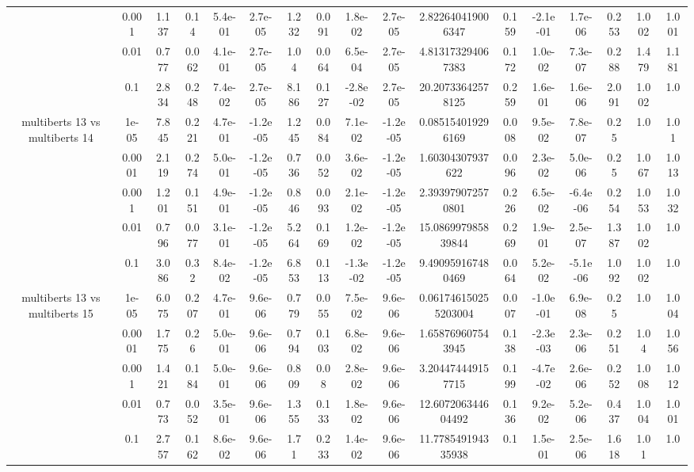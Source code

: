 \begin{tabular}{|c|c|c|c|c|c|c|c|c|c|c|c|c|c|c|c|c|}
 & 0.001 & 1.137 & 0.14 & 5.4e-01 & 2.7e-05 & 1.232 & 0.091 & 1.8e-02 & 2.7e-05 & 2.822640419006347 & 0.159 & -2.1e-01 & 1.7e-06 & 0.253 & 1.002 & 1.001 \\
 & 0.01 & 0.777 & 0.062 & 4.1e-01 & 2.7e-05 & 1.04 & 0.064 & 6.5e-04 & 2.7e-05 & 4.813173294067383 & 0.172 & 1.0e-02 & 7.3e-07 & 0.288 & 1.479 & 1.181 \\
 & 0.1 & 2.834 & 0.248 & 7.4e-02 & 2.7e-05 & 8.186 & 0.127 & -2.8e-02 & 2.7e-05 & 20.20733642578125 & 0.259 & 1.6e-01 & 1.6e-06 & 2.091 & 1.002 & 1.0 \\
\hline
\multirow{5}{*}{multiberts 13 vs multiberts 14} & 1e-05 & 7.845 & 0.221 & 4.7e-01 & -1.2e-05 & 1.245 & 0.084 & 7.1e-02 & -1.2e-05 & 0.085154019296169 & 0.008 & 9.5e-02 & 7.8e-07 & 0.25 & 1.0 & 1.01 \\
 & 0.0001 & 2.119 & 0.274 & 5.0e-01 & -1.2e-05 & 0.736 & 0.052 & 3.6e-02 & -1.2e-05 & 1.60304307937622 & 0.096 & 2.3e-02 & 5.0e-06 & 0.25 & 1.067 & 1.013 \\
 & 0.001 & 1.201 & 0.151 & 4.9e-01 & -1.2e-05 & 0.846 & 0.093 & 2.1e-02 & -1.2e-05 & 2.393979072570801 & 0.226 & 6.5e-02 & -6.4e-06 & 0.254 & 1.053 & 1.032 \\
 & 0.01 & 0.796 & 0.077 & 3.1e-01 & -1.2e-05 & 5.264 & 0.169 & 1.2e-02 & -1.2e-05 & 15.086997985839844 & 0.269 & 1.9e-01 & 2.5e-07 & 1.387 & 1.002 & 1.0 \\
 & 0.1 & 3.086 & 0.32 & 8.4e-02 & -1.2e-05 & 6.853 & 0.113 & -1.3e-02 & -1.2e-05 & 9.490959167480469 & 0.064 & 5.2e-02 & -5.1e-06 & 1.092 & 1.002 & 1.0 \\
\hline
\multirow{5}{*}{multiberts 13 vs multiberts 15} & 1e-05 & 6.075 & 0.207 & 4.7e-01 & 9.6e-06 & 0.779 & 0.055 & 7.5e-02 & 9.6e-06 & 0.061746150255203004 & 0.007 & -1.0e-01 & 6.9e-08 & 0.25 & 1.0 & 1.004 \\
 & 0.0001 & 1.775 & 0.26 & 5.0e-01 & 9.6e-06 & 0.794 & 0.103 & 6.8e-02 & 9.6e-06 & 1.658769607543945 & 0.138 & -2.3e-03 & 2.3e-06 & 0.251 & 1.04 & 1.056 \\
 & 0.001 & 1.421 & 0.184 & 5.0e-01 & 9.6e-06 & 0.809 & 0.08 & 2.8e-02 & 9.6e-06 & 3.204474449157715 & 0.199 & -4.7e-02 & 2.6e-06 & 0.252 & 1.008 & 1.012 \\
 & 0.01 & 0.773 & 0.052 & 3.5e-01 & 9.6e-06 & 1.355 & 0.133 & 1.8e-02 & 9.6e-06 & 12.607206344604492 & 0.136 & 9.2e-02 & 5.2e-06 & 0.437 & 1.004 & 1.001 \\
 & 0.1 & 2.757 & 0.162 & 8.6e-02 & 9.6e-06 & 1.71 & 0.233 & 1.4e-02 & 9.6e-06 & 11.778549194335938 & 0.1 & 1.5e-01 & 2.5e-06 & 1.618 & 1.01 & 1.0 \\

\end{tabular}
